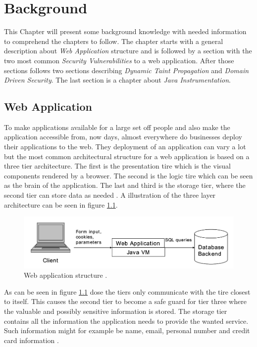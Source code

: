 \chapter{Background}
This Chapter will present some background knowledge with needed information to comprehend the chapters to follow. The chapter starts with a general description about \textit{Web Application} structure and is followed by a section with the two most common \textit{Security Vulnerabilities} to a web application. After those sections follows  two sections describing \textit{Dynamic Taint Propagation} and \textit{Domain Driven Security}. The last section is a chapter about \textit{Java Instrumentation}.


\section{Web Application}
To make applications available for a large set off people and also make the application accessible from, now days, almost everywhere do businesses deploy their applications to the web. They deployment of an application can vary a lot but the most common architectural structure for a web application is based on a three tier architecture. The first is the presentation tire which is the visual components rendered by a browser. The second is the logic tire which can be seen as the brain of the application. The last and third is the storage tier, where the second tier can store data as needed \parencite{JustinClarke-Salt2009SIAa}. A illustration of the three layer architecture can be seen in figure \ref{fig:webApplication-Haldar}.

\begin{figure}
  \centering
  \includegraphics[width=\textwidth]{images/webApplication-Haldar.png}
  \caption{Web application structure \cite{Haldar}.}
  \label{fig:webApplication-Haldar}
\end{figure}

As can be seen in figure \ref{fig:webApplication-Haldar} dose the tiers only communicate with the tire closest to itself. This causes the second tier to become a safe guard for tier three where the valuable and possibly sensitive information is stored. The storage tier contains all the information the application needs to provide the wanted service. Such information might for example be name, email, personal number and credit card information \parencite{JustinClarke-Salt2009SIAa}.


